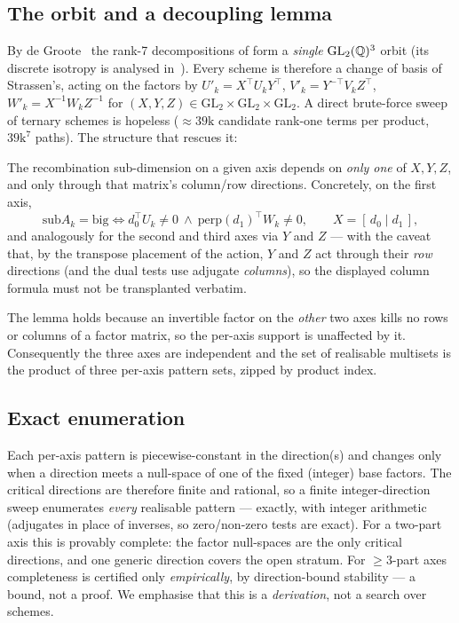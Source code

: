 \subsection{The orbit and a decoupling lemma}

By de Groote~\cite{degroote1978} the rank-7 decompositions of 
form a \emph{single} \(\mathrm{GL}_2(\mathbb{Q})^3\) orbit (its discrete
isotropy is analysed in~\cite{burichenko2014}). Every scheme is therefore a
change of basis of Strassen's, acting on the factors by
\(U'_k = X^{\!\top}U_kY^{\!\top}\),
\(V'_k = Y^{-\top}V_kZ^{\!\top}\),
\(W'_k = X^{-1}W_kZ^{-1}\)
for \((X,Y,Z)\in\mathrm{GL}_2\times\mathrm{GL}_2\times\mathrm{GL}_2\). A direct
brute-force sweep of ternary schemes is hopeless (\(\approx 39\text{k}\)
candidate rank-one terms per product, \(39\text{k}^7\) paths). The structure that
rescues it:

\begin{lemma}\label{lem:decouple}
The recombination sub-dimension on a given axis depends on \emph{only one} of
\(X,Y,Z\), and only through that matrix's column/row directions. Concretely, on
the first axis,
\[
  \mathrm{sub}A_k = \mathrm{big} \iff
  d_0^{\!\top}U_k\neq 0 \ \wedge\ \mathrm{perp}(d_1)^{\!\top}W_k\neq 0,
  \qquad X=[\,d_0\mid d_1\,],
\]
and analogously for the second and third axes via \(Y\) and \(Z\) --- with the
caveat that, by the transpose placement of the action, \(Y\) and \(Z\) act
through their \emph{row} directions (and the dual tests use adjugate
\emph{columns}), so the displayed column formula must not be transplanted
verbatim.
\end{lemma}

The lemma holds because an invertible factor on the \emph{other} two axes kills
no rows or columns of a factor matrix, so the per-axis support is unaffected by
it. Consequently the three axes are independent and the set of realisable
multisets is the product of three per-axis pattern sets, zipped by product index.

\subsection{Exact enumeration}

Each per-axis pattern is piecewise-constant in the direction(s) and changes only
when a direction meets a null-space of one of the fixed (integer) base factors.
The critical directions are therefore finite and rational, so a finite
integer-direction sweep enumerates \emph{every} realisable pattern --- exactly,
with integer arithmetic (adjugates in place of inverses, so zero/non-zero tests
are exact). For a two-part axis this is provably complete: the factor
null-spaces are the only critical directions, and one generic direction covers
the open stratum. For \(\ge 3\)-part axes completeness is certified only
\emph{empirically}, by direction-bound stability --- a bound, not a proof. We
emphasise that this is a \emph{derivation}, not a search over schemes.

